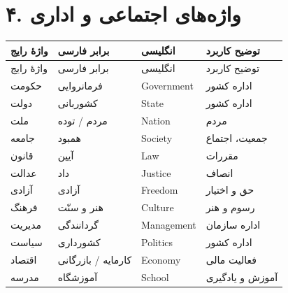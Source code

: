 \documentclass[a4paper,12pt,openany]{book}
\begin{document}
\section*{۴. واژه‌های اجتماعی و اداری}
\begingroup
\small
\setlength{\tabcolsep}{4pt}
\renewcommand{\arraystretch}{1.25}
\begin{longtable}{|p{2.5cm}|p{4.0cm}|p{2.3cm}|p{5.3cm}|}
\hline
واژهٔ رایج & برابر فارسی & انگلیسی & توضیح کاربرد \\
\hline
\endfirsthead
\hline
واژهٔ رایج & برابر فارسی & انگلیسی & توضیح کاربرد \\
\hline
\endhead
حکومت & فرمانروایی & \textenglish{Government} & اداره کشور \\
دولت & کشوربانی & \textenglish{State} & اداره کشور \\
ملت & مردم / توده & \textenglish{Nation} & مردم \\
جامعه & همبود & \textenglish{Society} & جمعیت، اجتماع \\
قانون & آیین & \textenglish{Law} & مقررات \\
عدالت & داد & \textenglish{Justice} & انصاف \\
آزادی & آزادی & \textenglish{Freedom} & حق و اختیار \\
فرهنگ & هنر و سنّت & \textenglish{Culture} & رسوم و هنر \\
مدیریت & گردانندگی & \textenglish{Management} & اداره سازمان \\
سیاست & کشورداری & \textenglish{Politics} & اداره کشور \\
اقتصاد & کارمایه / بازرگانی & \textenglish{Economy} & فعالیت مالی \\
مدرسه & آموزشگاه & \textenglish{School} & آموزش و یادگیری \\
\hline
\end{longtable}
\endgroup
\end{document}
